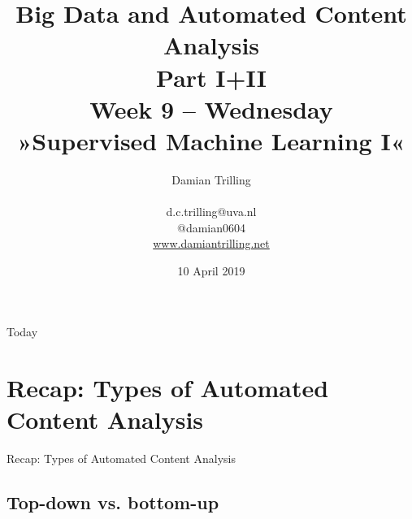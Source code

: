 \documentclass{beamer}
\begin{document}
\title[Big Data and Automated Content Analysis]{\textbf{Big Data and Automated Content Analysis\\ Part I+II} \\ Week 9 -- Wednesday \\ »Supervised Machine Learning I«}
\author[Damian Trilling]{Damian Trilling \\ ~ \\ \footnotesize{d.c.trilling@uva.nl \\@damian0604} \\ \url{www.damiantrilling.net}}
\date{10 April 2019}


\begin{frame}{}
\titlepage
\end{frame}

\begin{frame}{Today}
\tableofcontents
\end{frame}




\section[Recap]{Recap: Types of Automated Content Analysis}
\begin{frame}{}
Recap: Types of Automated Content Analysis
\end{frame}
\subsection*{Top-down vs. bottom-up}


\begin{frame}[plain]
\end{frame}
\end{document}
